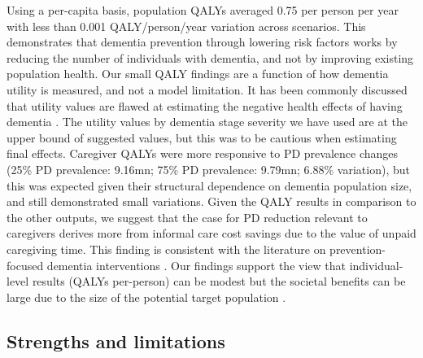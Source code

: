 \documentclass[11pt,a4paper]{article}
\begin{document}
Using a per-capita basis, population QALYs averaged 0.75 per person per year with less than 0.001 QALY/person/year variation across scenarios. This demonstrates that dementia prevention through lowering risk factors works by reducing the number of individuals with dementia, and not by improving existing population health. Our small QALY findings are a function of how dementia utility is measured, and not a model limitation. It has been commonly discussed that utility values are flawed at estimating the negative health effects of having dementia \cite{ref46}. The utility values by dementia stage severity we have used are at the upper bound of suggested values, but this was to be cautious when estimating final effects. Caregiver QALYs were more responsive to PD prevalence changes (25\% PD prevalence: 9.16mn; 75\% PD prevalence: 9.79mn; 6.88\% variation), but this was expected given their structural dependence on dementia population size, and still demonstrated small variations. Given the QALY results in comparison to the other outputs, we suggest that the case for PD reduction relevant to caregivers derives more from informal care cost savings due to the value of unpaid caregiving time. This finding is consistent with the literature on prevention-focused dementia interventions \cite{ref47}. Our findings support the view that individual-level results (QALYs per-person) can be modest but the societal benefits can be large due to the size of the potential target population \cite{ref48}.

\subsection{Strengths and limitations}
\end{document}
